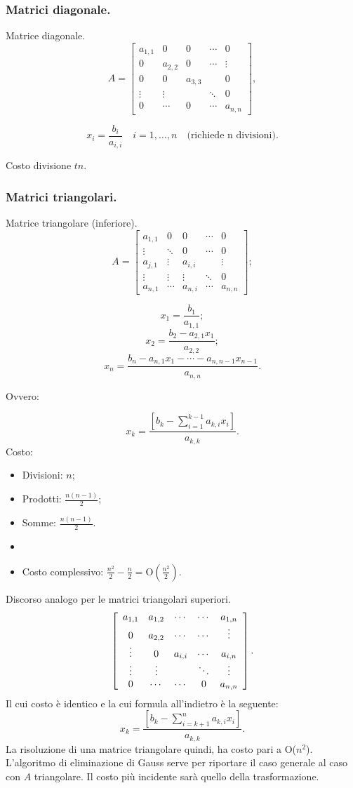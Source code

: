 \subsubsection{Matrici diagonale.}
Matrice diagonale.
\[
A = \left[ \begin{array}{ccccc}
a_{1,1} & 0 & 0 & \cdots & 0 \\
0 & a_{2,2}& 0 & \cdots & \vdots \\
0 & 0 & a_{3,3} &  & 0 \\
\vdots & \vdots &  & \ddots & 0 \\
0 & \cdots & 0 & \cdots & a_{n,n}
\end{array} \right],
\]


\[x_i = \frac{b_i}{a_{i,i}}\quad i = 1, \ldots, n \quad
\textrm{(richiede n divisioni).}\]

Costo divisione $tn$.

\subsubsection{Matrici triangolari.} %
Matrice triangolare (inferiore).
\[
A = \left[ \begin{array}{ccccc}
a_{1,1} & 0 & 0 & \cdots & 0 \\
\vdots & \ddots & 0 & \cdots & 0 \\
a_{j,1} & \vdots & a_{i,i} &  & \vdots \\
\vdots & \vdots & \vdots & \ddots & 0 \\
a_{n,1} & \cdots & a_{n,i} & \cdots & a_{n,n}
\end{array} \right];
\]

\[
x_1 = \frac{b_1}{a_{1,1}};\]
\[ x_2 = \frac{b_2 - a_{2,1}x_1}{a_{2,2}};\]
\[ x_n =
\frac{b_n - a_{n,1}x_1 - \cdots -a_{n,n-1}x_{n-1}}{a_{n,n}}.
\]

Ovvero:

\[
x_k = \frac{\left[b_k -\sum_{i = 1}^{k-1}a_{k,i}x_i\right]}{a_{k,k}}.
\]
Costo:
\begin{itemize}
\item[]Divisioni: $n$;
\item[]Prodotti: $\frac{n(n-1)}{2}$;
\item[]Somme: $\frac{n(n-1)}{2}$.
\item[]
\item[]Costo complessivo: $\frac{n^2}{2} - \frac{n}{2} =
\textrm{O}(\frac{n^2}{2})$.
\end{itemize}
Discorso analogo per le matrici triangolari superiori.
\[
\left[ \begin{array}{ccccc} a_{1,1} & a_{1,2} & \cdots & \cdots & a_{1,n} \\ 0 & a_{2,2} & \cdots & \cdots & \vdots \\ \vdots & 0 & a_{i,i} & \cdots & a_{i,n} \\ \vdots & \vdots & & \ddots & \vdots \\ 0 & \cdots & \cdots & 0 & a_{n,n} \end{array} \right].
\]
Il cui costo è identico e la cui formula all'indietro è la seguente:
\[
x_k = \frac{\left[b_k -\sum_{i = k+1}^na_{k,i}x_i\right]}{a_{k,k}}.
\]
La risoluzione di una matrice triangolare quindi, ha costo pari a O($n^2$).
L'algoritmo di eliminazione di Gauss serve per riportare il caso generale al
caso con $A$ triangolare. Il costo più incidente sarà quello della
trasformazione.

